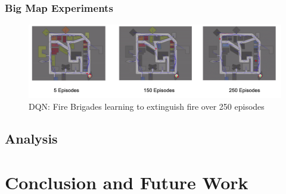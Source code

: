 \documentclass[12pt]{report}
\begin{document}
\subsection{Big Map Experiments}


\begin{figure}[!h]
    \centering
    \includegraphics[width=17cm]{DQN.png}
    \caption{DQN: Fire Brigades learning to extinguish fire over 250 episodes}
    \label{fig:DQNLearningSmallMap}
\end{figure}

\section{Analysis} \label{Analysis}


\chapter{Conclusion and Future Work}




      
\end{document}
